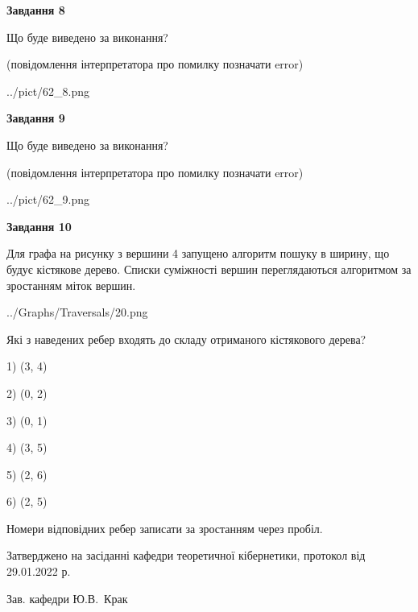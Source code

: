 \documentclass[12pt, ukrainian]{article}
\begin{document}
{\begin {large}
{\begin {center}\textbf{Завдання 8}\end {center}}\par
Що буде виведено за виконання?\par
 (повідомлення інтерпретатора про помилку позначати error)\par
\begin{center}
	{../pict/62_8.png}
\end{center}
\newpage

{\begin {center}\textbf{Завдання 9}\end {center}}\par
Що буде виведено за виконання?\par
 (повідомлення інтерпретатора про помилку позначати error)\par
\begin{center}
	{../pict/62_9.png}
\end{center}
\newpage

{\begin {center}\textbf{Завдання 10}\end {center}}\par
Для графа на рисунку з вершини 4 запущено алгоритм пошуку в ширину, що будує кістякове дерево. Списки суміжності вершин переглядаються алгоритмом за зростанням міток вершин.\par
\begin{center}
	{../Graphs/Traversals/20.png}
\end{center}
\par Які з наведених ребер входять до складу отриманого кістякового дерева?\par
1) (3, 4)\par
2) (0, 2)\par
3) (0, 1)\par
4) (3, 5)\par
5) (2, 6)\par
6) (2, 5)\par
{\vskip 15pt} Номери відповідних ребер записати за зростанням через пробіл.\par
\newpage


\end {large}
}
{\smallskip \begin {small} Затверджено на засіданні кафедри теоретичної кібернетики, протокол  від   29.01.2022 р.\par\smallskip\smallskip
{\parbox {6.5 cm}{Зав. кафедри \dotfill Ю.В.~Крак}} \end{small}}
\end{document}
